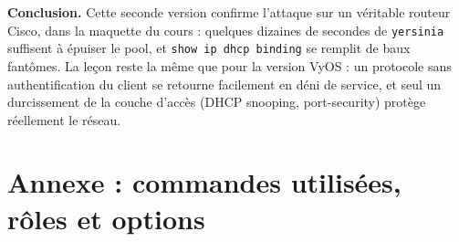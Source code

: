 \documentclass[11pt,a4paper]{article}
\begin{document}
\medskip
\noindent\textbf{Conclusion.} Cette seconde version confirme l'attaque sur un véritable routeur
Cisco, dans la maquette du cours : quelques dizaines de secondes de \texttt{yersinia} suffisent
à épuiser le pool, et \texttt{show ip dhcp binding} se remplit de baux fantômes. La leçon reste
la même que pour la version VyOS : un protocole sans authentification du client se retourne
facilement en déni de service, et seul un durcissement de la couche d'accès (DHCP snooping,
port-security) protège réellement le réseau.

\signatureHamady

\section{Annexe : commandes utilisées, rôles et options}
\end{document}
